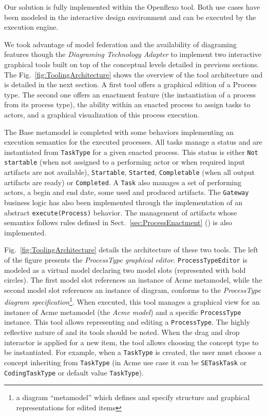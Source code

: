 Our solution is fully implemented within the Openflexo tool. Both use cases
have been modeled in the interactive design environment and can be executed by
the \FML execution engine.


We took advantage of model federation and the availability of diagraming
features though the \textit{Diagraming Technology Adapter} to implement two
interactive graphical tools built on top of the conceptual levels detailed in
previous sections. The Fig.~\ref{fig:ToolingArchitecture} shows the overview of
the tool architecture and is detailed in the next section. A first tool offers
a graphical edition of a Process type. The second one offers an enactment
feature (the instantiation of a process from its process type), the ability
within an enacted process to assign tasks to actors, and a graphical
visualization of this process execution.


The Base metamodel is completed with some behaviors implementing an execution
semantics for the executed processes. All tasks manage a status and are
instantiated from \texttt{TaskType} for a given enacted process. This status is
either \texttt{Not startable} (when not assigned to a performing actor or when
required input artifacts are not available), \texttt{Startable},
\texttt{Started}, \texttt{Completable} (when all output artifacts are ready) or
\texttt{Completed}. A \texttt{Task} also manages a set of performing actors, a
begin and end date, some used and produced artifacts. The \texttt{Gateway}
business logic has also been implemented through the implementation of an
abstract \texttt{execute(Process)} behavior. The management of artifacts whose
semantics follows rules defined in Sect.~\ref{sec:ProcessEnactment} ()
is also implemented.

Fig.~\ref{fig:ToolingArchitecture} details the architecture of these two tools.
The left of the figure presents the \textit{ProcessType graphical editor}.
\texttt{ProcessTypeEditor} is modeled as a virtual model declaring two model
slots (represented with bold circles). The first model slot references an
instance of Acme metamodel, while the second model slot references an instance
of diagram, conforms to the \textit{ProcessType diagram
specification}\footnote{a diagram \enquote{metamodel} which defines and specify
structure and graphical representations for edited items}. When executed, this
tool manages a graphical view for an instance of Acme metamodel (the
\textit{Acme model}) and a specific \texttt{ProcessType} instance. This tool
allows representing and editing a \texttt{ProcessType}. The highly reflective
nature of \FML and its tools should be noted. When the drag and drop interactor
is applied for a new item, the tool allows choosing the concept type to be
instantiated. For example, when a \texttt{TaskType} is created, the user must
choose a concept inheriting from \texttt{TaskType} (in Acme use case it can be
  \texttt{SETaskTask} or \texttt{CodingTaskType} or default value
\texttt{TaskType}).

